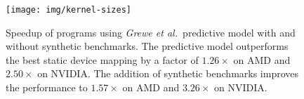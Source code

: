 \begin{figure}
  \centering %
    \texttt{[image: img/kernel-sizes]}%
  \caption{Speedup of programs using \emph{Grewe et al.\ }predictive model with and without synthetic benchmarks. The predictive model outperforms the best static device mapping by a factor of $1.26\times$ on AMD and $2.50\times$ on NVIDIA. The addition of synthetic benchmarks improves the performance to $1.57\times$ on AMD and $3.26\times$ on NVIDIA.}%
  \label{fig:kernel-sizes} %
\end{figure}
